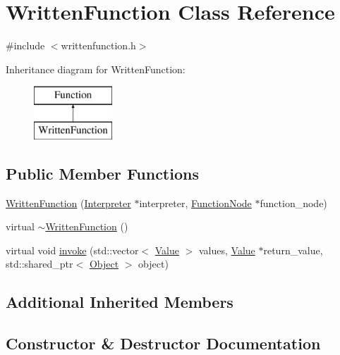 \hypertarget{classWrittenFunction}{}\section{Written\+Function Class Reference}
\label{classWrittenFunction}


{\ttfamily \#include $<$writtenfunction.\+h$>$}

Inheritance diagram for Written\+Function\+:\begin{figure}[H]
\begin{center}
\leavevmode
\includegraphics[height=2.000000cm]{classWrittenFunction}
\end{center}
\end{figure}
\subsection*{Public Member Functions}
\begin{DoxyCompactItemize}
\item 
\hyperlink{classWrittenFunction_a5bdf425b86c5dbfd481a2d265a889c88}{Written\+Function} (\hyperlink{classInterpreter}{Interpreter} $\ast$interpreter, \hyperlink{classFunctionNode}{Function\+Node} $\ast$function\+\_\+node)
\item 
virtual \hyperlink{classWrittenFunction_a46facc10f998146c7709772b0b662ad6}{$\sim$\+Written\+Function} ()
\item 
virtual void \hyperlink{classWrittenFunction_afe56e5eb6a13f6e38ab5ec87e371d745}{invoke} (std\+::vector$<$ \hyperlink{classValue}{Value} $>$ values, \hyperlink{classValue}{Value} $\ast$return\+\_\+value, std\+::shared\+\_\+ptr$<$ \hyperlink{classObject}{Object} $>$ object)
\end{DoxyCompactItemize}
\subsection*{Additional Inherited Members}


\subsection{Constructor \& Destructor Documentation}
\mbox{\label{classWrittenFunction_a5bdf425b86c5dbfd481a2d265a889c88}} 
